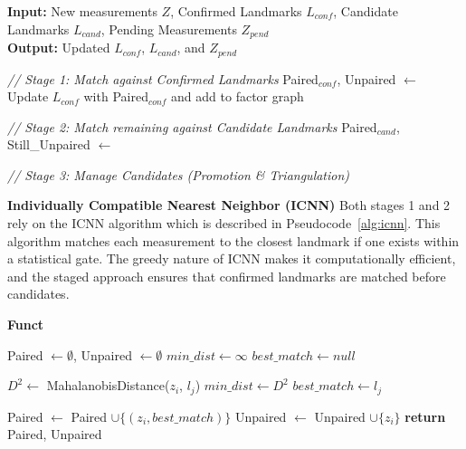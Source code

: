 \documentclass[
	parspace, %
	noindent, %
	final, %
]{elteikthesis}
\begin{document}
\begin{algorithm}[h]
\caption{Overall Detection Association Pipeline} 
\label{alg:overall_pipeline} 
\textbf{Input:} New measurements $Z$, Confirmed Landmarks $L_{conf}$, Candidate Landmarks $L_{cand}$, Pending Measurements $Z_{pend}$ \\
\textbf{Output:} Updated $L_{conf}$, $L_{cand}$, and $Z_{pend}$
\begin{algorithmic}[1]
    \State \textit{// Stage 1: Match against Confirmed Landmarks}
    \State Paired$_{conf}$, Unpaired $\leftarrow$ 
    \State Update $L_{conf}$ with Paired$_{conf}$ and add to factor graph
    
        \State \textit{// Stage 2: Match remaining against Candidate Landmarks}
        \State Paired$_{cand}$, Still\_Unpaired $\leftarrow$ 
        
        \State \textit{// Stage 3: Manage Candidates (Promotion \& Triangulation)}
        \State {}
    \EndIf
\end{algorithmic}
\end{algorithm}

\textbf{Individually Compatible Nearest Neighbor (ICNN)} Both stages 1 and 2 rely on the ICNN algorithm \cite{data_neira_2001} which is described in Pseudocode~\ref{alg:icnn}. This algorithm matches each measurement to the closest landmark if one exists within a statistical gate. The greedy nature of ICNN makes it computationally efficient, and the staged approach ensures that confirmed landmarks are matched before candidates.

\begin{algorithm}[h]
\caption{ICNN with Chi-square Gating} 
\label{alg:icnn} 
\textbf{Funct} 
\begin{algorithmic}[1]
    \State Paired $\leftarrow \emptyset$, Unpaired $\leftarrow \emptyset$
        \State $min\_dist \leftarrow \infty$
        \State $best\_match \leftarrow null$
        
            \State $D^2 \leftarrow$ MahalanobisDistance($z_i$, $l_j$)
                \State $min\_dist \leftarrow D^2$
                \State $best\_match \leftarrow l_j$
            \EndIf
        \EndFor
        
            \State Paired $\leftarrow$ Paired $\cup \{ (z_i, best\_match) \}$
        \Else
            \State Unpaired $\leftarrow$ Unpaired $\cup \{ z_i \}$
        \EndIf
    \EndFor
    \State \textbf{return} Paired, Unpaired
\end{algorithmic}
\end{algorithm}
\end{document}
